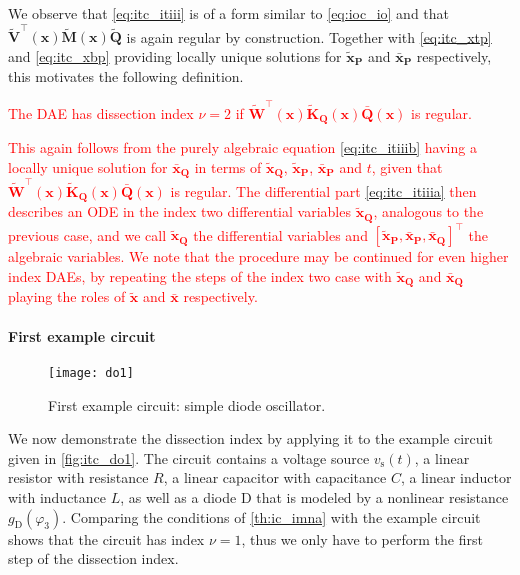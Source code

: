 \documentclass[AMA,STIX1COL]{WileyNJD-v2}
\newcommand{\mb}[1]{\mathbf{#1}}
\newcommand{\mbt}[1]{\tilde{\mathbf{#1}}}
\newcommand{\mbb}[1]{\bar{\mathbf{#1}}}
\newcommand{\mr}[1]{\mathrm{#1}}
\newcommand{\T}{{\!\top}}
\begin{document}
We observe that \eqref{eq:itc_itiii} is of a form similar to \eqref{eq:ioc_io} and that $\mbt{V}^\T (\mb{x}) \mbt{M}(\mb{x}) \mbt{Q}$ is again regular by construction\cite{jansen2014}. Together with \eqref{eq:itc_xtp} and \eqref{eq:itc_xbp} providing locally unique solutions for $\mbt{x}_\mb{P}$ and $\mbb{x}_\mb{P}$ respectively, this motivates the following definition.
\textcolor{red}{\begin{definition}
    \label{def:itc_it}
     The DAE has dissection index $\nu = 2$ if $\mbt{W}^\T (\mb{x}) \mbt{K}_\mb{Q}(\mb{x}) \mbb{Q}(\mb{x})$ is regular.
\end{definition}
This again follows from the purely algebraic equation \eqref{eq:itc_itiiib} having a locally unique solution for $\mbb{x}_\mb{Q}$ in terms of $\mbt{x}_\mb{Q}$, $\mbt{x}_\mb{P}$, $\mbb{x}_\mb{P}$ and $t$, given that $\mbt{W}^\T (\mb{x}) \mbt{K}_\mb{Q}(\mb{x}) \mbb{Q}(\mb{x})$ is regular. The differential part \eqref{eq:itc_itiiia} then describes an ODE in the index two differential variables $\mbt{x}_\mb{Q}$, analogous to the previous case, and we call $\mbt{x}_\mb{Q}$ the differential variables and $[\mbt{x}_\mb{P}, \mbb{x}_\mb{P}, \mbb{x}_\mb{Q}]^\T$ the algebraic variables. We note that the procedure may be continued for even higher index DAEs, by repeating the steps of the index two case with $\mbt{x}_\mb{Q}$ and $\mbb{x}_\mb{Q}$ playing the roles of $\mbt{x}$ and $\mbb{x}$ respectively.}

\paragraph{First example circuit}
\begin{figure}[b]
    \begin{center}
        \texttt{[image: do1]}
    \end{center}
    \caption{First example circuit: simple diode oscillator.}
    \label{fig:itc_do1}
\end{figure}
We now demonstrate the dissection index by applying it to the example circuit given in \autoref{fig:itc_do1}. The circuit contains a voltage source $v_\mr{s}(t)$, a linear resistor with resistance $R$, a linear capacitor with capacitance $C$, a linear inductor with inductance $L$, as well as a diode $\mr{D}$ that is modeled by a nonlinear resistance $g_\mr{D}(\varphi_3)$. Comparing the conditions of \autoref{th:ic_imna} with the example circuit shows that the circuit has index $\nu = 1$, thus we only have to perform the first step of the dissection index.
\end{document}
